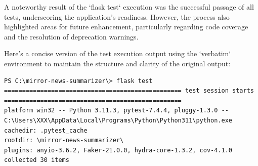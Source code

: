 \documentclass[10pt]{article}
\begin{document}
A noteworthy result of the `flask test` execution was the successful passage of all tests, underscoring the application's readiness. However, the process also highlighted areas for future enhancement, particularly regarding code coverage and the resolution of deprecation warnings.

Here's a concise version of the test execution output using the `verbatim` environment to maintain the structure and clarity of the original output:

\noindent\begin{Verbatim}[fontsize=\scriptsize]
PS C:\mirror-news-summarizer\> flask test
================================================= test session starts =================================================
platform win32 -- Python 3.11.3, pytest-7.4.4, pluggy-1.3.0 -- C:\Users\XXX\AppData\Local\Programs\Python\Python311\python.exe
cachedir: .pytest_cache
rootdir: \mirror-news-summarizer\
plugins: anyio-3.6.2, Faker-21.0.0, hydra-core-1.3.2, cov-4.1.0
collected 30 items


\end{Verbatim}
\end{document}
